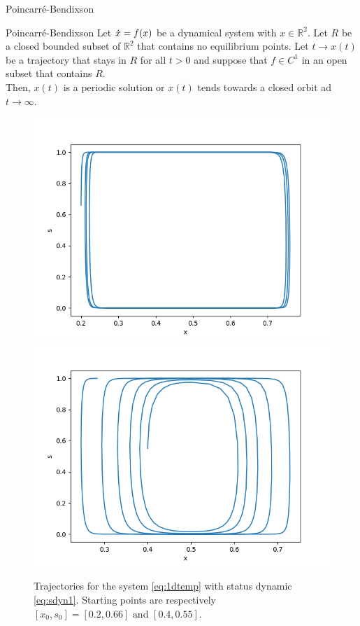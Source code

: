 \documentclass[10pt]{beamer}
\begin{document}
\begin{frame}{Poincarré-Bendixson}
\begin{theorem}{Poincarré-Bendixson}
\label{th:pb}
Let $\dot{x} = f(x)$ be a dynamical system with $x \in \mathbb{R}^2$. Let $R$ be a closed bounded subset of $\mathbb{R}^2$ that contains no equilibrium points. Let $t\rightarrow x(t)$ be a trajectory that stays in $R$ for all $t > 0$ and suppose that $f \in C^1$ in an open subset that contains $R$.\\
Then, $x(t)$ is a periodic solution or $x(t)$ tends towards a closed orbit ad $t \rightarrow \infty$.
\end{theorem}

\begin{figure}[H]
\centering
\includegraphics[scale=0.2]{traj1D1_02066.png}
\includegraphics[scale=0.2]{traj1D1_04055.png}
\caption{Trajectories for the system \ref{eq:1dtemp} with status dynamic \ref{eq:sdyn1}. Starting points are respectively $[x_0, s_0] = [0.2, 0.66] \text{   and   } [0.4, 0.55]$.}
\label{fig:traj1D1}
\end{figure}

\end{frame}
\end{document}
